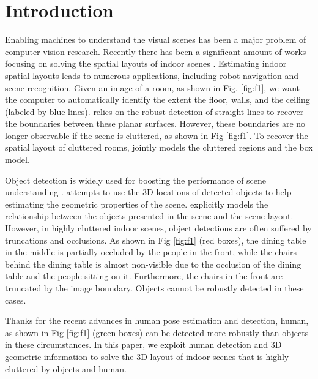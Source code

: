 \section{Introduction}
Enabling machines to understand the visual scenes has been a major problem of computer vision research. Recently there has been a significant amount of works focusing on solving the spatial layouts of indoor scenes \cite{Hedau_ICCV2009,Lee_NIPS2010,Lee_CVPR2009,Schwing_CVPR2012,Wang_ECCV2010}. Estimating indoor spatial layouts leads to numerous applications, including robot navigation and scene recognition. Given an image of a room, as shown in Fig. \ref{fig:f1}, we want the computer to automatically identify the extent the floor, walls, and the ceiling (labeled by blue lines). \cite{Lee_CVPR2009} relies on the robust detection of straight lines to recover the boundaries between these planar surfaces. However, these boundaries are no longer observable if the scene is cluttered, as shown in Fig \ref{fig:f1}. To recover the spatial layout of cluttered rooms, \cite{Hedau_ICCV2009} jointly models the cluttered regions and the box model.


Object detection is widely used for boosting the performance of scene understanding \cite{Bao_CVPR2010,Lee_NIPS2010}. \cite{Bao_CVPR2010} attempts to use the 3D locations of detected objects to help estimating the geometric properties of the scene. \cite{Lee_NIPS2010} explicitly models the relationship between the objects presented in the scene and the scene layout. However, in highly cluttered indoor scenes, object detections are often suffered by truncations and occlusions. As shown in Fig \ref{fig:f1} (red boxes), the dining table in the middle is partially occluded by the people in the front, while the chairs behind the dining table is almost non-visible due to the occlusion of the dining table and the people sitting on it. Furthermore, the chairs in the front are truncated by the image boundary. Objects cannot be robustly detected in these cases.

Thanks for the recent advances in human pose estimation and detection, human, as shown in Fig \ref{fig:f1} (green boxes) can be detected more robustly than objects in these circumstances. In this paper, we exploit human detection and 3D geometric information to solve the 3D layout of indoor scenes that is highly cluttered by objects and human.

